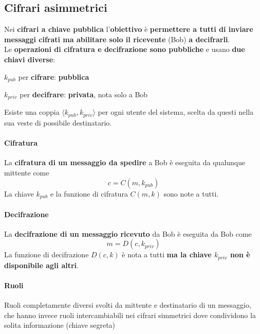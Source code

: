 \documentclass[10pt]{book}
\begin{document}
\subsection{Cifrari asimmetrici} Nei \textbf{cifrari a chiave pubblica} l'\textbf{obiettivo} è \textbf{permettere a tutti di inviare messaggi cifrati ma abilitare solo il ricevente} (Bob) \textbf{a decifrarli}.\\
Le \textbf{operazioni di cifratura e decifrazione sono pubbliche} e usano \textbf{due chiavi diverse}:
\begin{list}{}{}
	\item $k_{pub}$ per \textbf{cifrare}: \textbf{pubblica}
	\item $k_{priv}$ per \textbf{decifrare}: \textbf{privata}, nota solo a Bob
\end{list}
Esiste una coppia $\langle k_{pub}, k_{priv}\rangle$ per ogni utente del sistema, scelta da questi nella sua veste di possibile destinatario.
\paragraph{Cifratura} La \textbf{cifratura di un messaggio da spedire} a Bob è eseguita da qualunque mittente come $$c = C(m, k_{pub})$$ La chiave $k_{pub}$ e la funzione di cifratura $C(m, k)$ sono note a tutti.
\paragraph{Decifrazione} La \textbf{decifrazione di un messaggio ricevuto} da Bob è eseguita da Bob come $$m = D(c, k_{priv})$$ La funzione di decifrazione $D(c, k)$ è nota a tutti \textbf{ma la chiave $k_{priv}$ non è disponibile agli altri}.
\paragraph{Ruoli} Ruoli completamente diversi svolti da mittente e destinatario di un messaggio, che hanno invece ruoli intercambiabili nei cifrari simmetrici dove condividono la solita informazione (chiave segreta)
\end{document}
